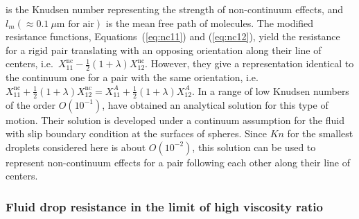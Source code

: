 \documentclass[../thesis.tex]{subfiles}
\begin{document}
is the Knudsen number representing the strength of non-continuum effects, and $l_m (\approx 0.1~\mu \text{m for air})$ is the mean free path of molecules. The modified resistance functions, Equations~(\ref{eq:nc11}) and (\ref{eq:nc12}), yield the resistance for a rigid pair translating with an opposing orientation along their line of centers, i.e.\ $X^\text{nc}_{11} - \frac{1}{2}(1+\lambda) X^\text{nc}_{12}$. However, they give a representation identical to the continuum one for a pair with the same orientation, i.e.\ $X^\text{nc}_{11} + \frac{1}{2}(1+\lambda) X^\text{nc}_{12}=X^A_{11} + \frac{1}{2}(1+\lambda) X^A_{12}$. In a range of low Knudsen numbers of the order $O(10^{-1})$, \cite{RM74} have obtained an analytical solution for this type of motion. Their solution is developed under a continuum assumption for the fluid with slip boundary condition at the surfaces of spheres. Since $Kn$ for the smallest droplets considered here is about $O(10^{-2})$, this solution can be used to represent non-continuum effects for a pair following each other along their line of centers.

\subsubsection{Fluid drop resistance in the limit of high viscosity ratio\label{sec:freerot}}
\end{document}
